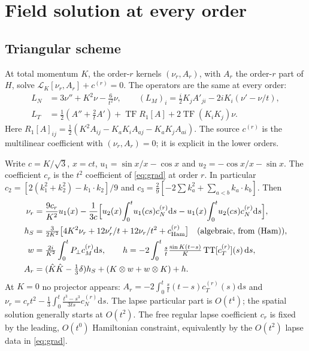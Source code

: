 \documentclass[11pt]{article}
\theoremstyle{definition}
\theoremstyle{remark}
\newcommand{\dd}{\mathrm{d}}
\newcommand{\TF}{\operatorname{TF}}
\begin{document}
\section{Field solution at every order}\label{sec:fields}

\subsection{Triangular scheme}

At total momentum $K$, the order-$r$ kernels $(\nu_r,A_r)$, with $A_r$ the order-$r$ part of
$H$, solve $\mathcal L_K[\nu_r,A_r]+c^{(r)}=0$. The operators are the same at every order:
\begin{align*}
L_N&=3\nu''+K^2\nu-\tfrac{6}{t^2}\nu,\qquad
(L_M)_i=\tfrac i2K_jA'_{ji}-2iK_i(\nu'-\nu/t),\\
L_T&=\tfrac12(A''+\tfrac2tA')+\TF R_1[A]+2\TF(K_iK_j)\nu .
\end{align*}
Here $R_1[A]_{ij}=\frac12(K^2A_{ij}-K_aK_iA_{aj}-K_aK_jA_{ai})$. The source $c^{(r)}$ is the
multilinear coefficient with $(\nu_r,A_r)=0$; it is explicit in the lower orders.

Write $c=K/\sqrt3$, $x=ct$, $u_1=\sin x/x-\cos x$ and $u_2=-\cos x/x-\sin x$. The coefficient
$c_r$ is the $t^2$ coefficient of \eqref{eq:grad} at order $r$. In particular
$c_2=[2(k_1^2+k_2^2)-k_1\cdot k_2]/9$ and $c_3=\frac29[-2\sum k_a^2+\sum_{a<b}k_a\cdot k_b]$.
Then
\begin{align}
\nu_r&=\frac{9c_r}{K^2}u_1(x)-\frac{1}{3c}\Big[u_2(x)\!\int_0^t\!u_1(cs)c_N^{(r)}\dd s-u_1(x)\!\int_0^t\!u_2(cs)c_N^{(r)}\dd s\Big],\\
h_S&=\tfrac{3}{2K^2}\big[4K^2\nu_r+12\nu_r'/t+12\nu_r/t^2+c_{\rm Ham}^{(r)}\big]\quad\text{(algebraic, from (Ham))},\\
w&=\tfrac{2i}{K^2}\int_0^tP_\perp c_M^{(r)}\dd s,\qquad
h=-2\int_0^t\tfrac{s}{t}\tfrac{\sin K(t-s)}{K}\,\mathrm{TT}[c_T^{(r)}](s)\,\dd s,\\
A_r&=(\hat K\hat K-\tfrac13\delta)h_S+(K\otimes w+w\otimes K)+h .
\end{align}
At $K=0$ no projector appears: $A_r=-2\int_0^t\frac st(t-s)c_T^{(r)}(s)\dd s$ and
$\nu_r=c_rt^2-\frac13\int_0^t\frac{t^3-s^3}{3ts}c_N^{(r)}\dd s$. The lapse particular part is
$O(t^4)$; the spatial solution generally starts at $O(t^2)$. The free regular lapse coefficient
$c_r$ is fixed by the leading, $O(t^0)$ Hamiltonian constraint, equivalently by the
$O(t^2)$ lapse data in \eqref{eq:grad}.
\end{document}

